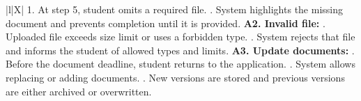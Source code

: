 \begin{xltabular}{\textwidth}{|l|X|}
        1. At step 5, student omits a required file. . System highlights the missing document and prevents completion until it is provided. \newline
        \textbf{A2. Invalid file:} . Uploaded file exceeds size limit or uses a forbidden type. . System rejects that file and informs the student of allowed types and limits. \newline
        \textbf{A3. Update documents:} . Before the document deadline, student returns to the application. . System allows replacing or adding documents. . New versions are stored and previous versions are either archived or overwritten. \\ \hline
\end{xltabular}


